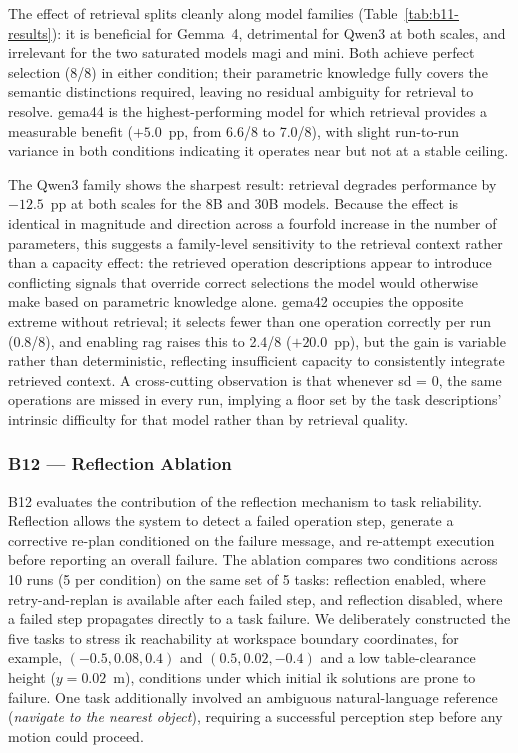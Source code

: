 \documentclass[
     12pt,
     a4paper,
     BCOR=10mm,
     DIV=14,
     listof=totoc,
     bibliography=totoc,
     parskip,
     twoside,
     headsepline
     ]{scrreprt}
\begin{document}
The effect of retrieval splits cleanly along model families (Table~\ref{tab:b11-results}): it is beneficial for Gemma~4, detrimental for Qwen3 at both scales, and irrelevant for the two saturated models \gls{magi} and \gls{mini}. Both achieve perfect selection (8/8) in either condition; their parametric knowledge fully covers the semantic distinctions required, leaving no residual ambiguity for retrieval to resolve. \gls{gema44} is the highest-performing model for which retrieval provides a measurable benefit ($+5.0$~pp, from 6.6/8 to 7.0/8), with slight run-to-run variance in both conditions indicating it operates near but not at a stable ceiling.

The Qwen3 family shows the sharpest result: retrieval degrades performance by $-12.5$~pp at both scales for the 8B and 30B models. Because the effect is identical in magnitude and direction across a fourfold increase in the number of parameters, this suggests a family-level sensitivity to the retrieval context rather than a capacity effect: the retrieved operation descriptions appear to introduce conflicting signals that override correct selections the model would otherwise make based on parametric knowledge alone. \gls{gema42} occupies the opposite extreme without retrieval; it selects fewer than one operation correctly per run (0.8/8), and enabling \gls{rag} raises this to 2.4/8 ($+20.0$~pp), but the gain is variable rather than deterministic, reflecting insufficient capacity to consistently integrate retrieved context. A cross-cutting observation is that whenever \gls{sd} = 0, the same operations are missed in every run, implying a floor set by the task descriptions' intrinsic difficulty for that model rather than by retrieval quality.

\subsubsection{B12 --- Reflection Ablation}\label{sec:results-reflection}

B12 evaluates the contribution of the reflection mechanism to task reliability. Reflection allows the system to detect a failed operation step, generate a corrective re-plan conditioned on the failure message, and re-attempt execution before reporting an overall failure. The ablation compares two conditions across 10 runs (5 per condition) on the same set of 5 tasks: reflection enabled, where retry-and-replan is available after each failed step, and reflection disabled, where a failed step propagates directly to a task failure. We deliberately constructed the five tasks to stress \gls{ik} reachability at workspace boundary coordinates, for example, $(-0.5, 0.08, 0.4)$ and $(0.5, 0.02, -0.4)$ and a low table-clearance height ($y = 0.02$~m), conditions under which initial \gls{ik} solutions are prone to failure. One task additionally involved an ambiguous natural-language reference (\textit{navigate to the nearest object}), requiring a successful perception step before any motion could proceed.
\end{document}
